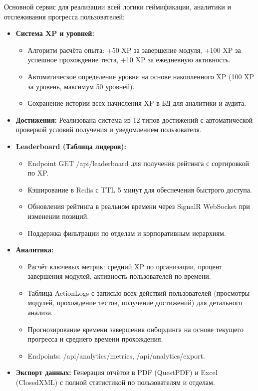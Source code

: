 Основной сервис для реализации всей логики геймификации, аналитики и отслеживания прогресса пользователей:
\begin{itemize}
	\item \textbf{Система XP и уровней:} 
	\begin{itemize}
		\item Алгоритм расчёта опыта: +50 XP за завершение модуля, +100 XP за успешное прохождение теста, +10 XP за ежедневную активность.
		\item Автоматическое определение уровня на основе накопленного XP (100 XP за уровень, максимум 50 уровней).
		\item Сохранение истории всех начисления XP в БД для аналитики и аудита.
	\end{itemize}
	
	\item \textbf{Достижения:} Реализована система из 12 типов достижений с автоматической проверкой условий получения и уведомлением пользователя.
	
	\item \textbf{Leaderboard (Таблица лидеров):}
	\begin{itemize}
		\item Endpoint GET /api/leaderboard для получения рейтинга с сортировкой по XP.
		\item Кэширование в Redis с TTL 5 минут для обеспечения быстрого доступа.
		\item Обновления рейтинга в реальном времени через SignalR WebSocket при изменении позиций.
		\item Поддержка фильтрации по отделам и корпоративным иерархиям.
	\end{itemize}
	
	\item \textbf{Аналитика:} 
	\begin{itemize}
		\item Расчёт ключевых метрик: средний XP по организации, процент завершения модулей, активность пользователей по времени.
		\item Таблица ActionLogs с записью всех действий пользователей (просмотры модулей, прохождение тестов, получение достижений) для детального анализа.
		\item Прогнозирование времени завершения онбординга на основе текущего прогресса и среднего времени прохождения.
		\item Endpoints: /api/analytics/metrics, /api/analytics/export.
	\end{itemize}
	
	\item \textbf{Экспорт данных:} Генерация отчётов в PDF (QuestPDF) и Excel (ClosedXML) с полной статистикой по пользователям и отделам.
\end{itemize}

